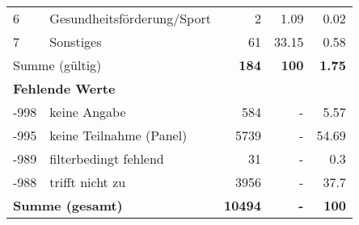\begin{longtable}{lXrrr}
     6 &
     \multicolumn{1}{X}{ Gesundheitsförderung/Sport   } &


       \num{2} &
       \num[round-mode=places,round-precision=2]{1,09} &
         \num[round-mode=places,round-precision=2]{0,02} \\

     7 &
     \multicolumn{1}{X}{ Sonstiges   } &


       \num{61} &
       \num[round-mode=places,round-precision=2]{33,15} &
         \num[round-mode=places,round-precision=2]{0,58} \\
     \midrule
     \multicolumn{2}{l}{Summe (gültig)} &
       \textbf{\num{184}} &
     \textbf{100} &
       \textbf{\num[round-mode=places,round-precision=2]{1,75}} \\
     \multicolumn{5}{l}{\textbf{Fehlende Werte}}\\
       -998 &
       keine Angabe &
         \num{584} &
        - &
         \num[round-mode=places,round-precision=2]{5,57} \\
       -995 &
       keine Teilnahme (Panel) &
         \num{5739} &
        - &
         \num[round-mode=places,round-precision=2]{54,69} \\
       -989 &
       filterbedingt fehlend &
         \num{31} &
        - &
         \num[round-mode=places,round-precision=2]{0,3} \\
       -988 &
       trifft nicht zu &
         \num{3956} &
        - &
         \num[round-mode=places,round-precision=2]{37,7} \\
     \midrule
     \multicolumn{2}{l}{\textbf{Summe (gesamt)}} &
          \textbf{\num{10494}} &
        \textbf{-} &
        \textbf{100} \\
     \bottomrule
     \end{longtable}
     
